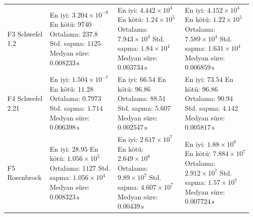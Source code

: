 \begin{longtable}{@{}p{2.25cm}p{4.25cm}p{4.25cm}p{4.25cm}@{}}
F3 Schwefel 1.2 & \makecell[l]{En iyi: $3.204\times 10^{-9}$\\ En kötü: $9740$\\ Ortalama: $237.8$\\ Std. sapma: $1125$\\ Medyan süre: $0.008233\,\mathrm{s}$} & \makecell[l]{En iyi: $4.442\times 10^{4}$\\ En kötü: $1.24\times 10^{5}$\\ Ortalama: $7.943\times 10^{4}$\\ Std. sapma: $1.84\times 10^{4}$\\ Medyan süre: $0.003734\,\mathrm{s}$} & \makecell[l]{En iyi: $4.152\times 10^{4}$\\ En kötü: $1.22\times 10^{5}$\\ Ortalama: $7.589\times 10^{4}$\\ Std. sapma: $1.631\times 10^{4}$\\ Medyan süre: $0.006859\,\mathrm{s}$} \\
F4 Schwefel 2.21 & \makecell[l]{En iyi: $1.504\times 10^{-7}$\\ En kötü: $11.28$\\ Ortalama: $0.7973$\\ Std. sapma: $1.714$\\ Medyan süre: $0.006398\,\mathrm{s}$} & \makecell[l]{En iyi: $66.54$\\ En kötü: $96.86$\\ Ortalama: $88.51$\\ Std. sapma: $5.607$\\ Medyan süre: $0.002547\,\mathrm{s}$} & \makecell[l]{En iyi: $73.54$\\ En kötü: $96.86$\\ Ortalama: $90.94$\\ Std. sapma: $4.142$\\ Medyan süre: $0.005817\,\mathrm{s}$} \\
F5 Rosenbrock & \makecell[l]{En iyi: $28.95$\\ En kötü: $1.056\times 10^{5}$\\ Ortalama: $1127$\\ Std. sapma: $1.056\times 10^{4}$\\ Medyan süre: $0.008323\,\mathrm{s}$} & \makecell[l]{En iyi: $2.617\times 10^{7}$\\ En kötü: $2.649\times 10^{8}$\\ Ortalama: $9.89\times 10^{7}$\\ Std. sapma: $4.607\times 10^{7}$\\ Medyan süre: $0.00439\,\mathrm{s}$} & \makecell[l]{En iyi: $1.88\times 10^{6}$\\ En kötü: $7.884\times 10^{7}$\\ Ortalama: $2.912\times 10^{7}$\\ Std. sapma: $1.57\times 10^{7}$\\ Medyan süre: $0.007724\,\mathrm{s}$} \\

\end{longtable}
